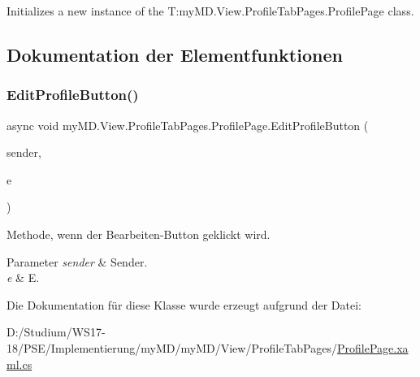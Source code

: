 Initializes a new instance of the T\+:my\+M\+D.\+View.\+Profile\+Tab\+Pages.\+Profile\+Page class. 



\subsection{Dokumentation der Elementfunktionen}
\mbox{\label{classmy_m_d_1_1_view_1_1_profile_tab_pages_1_1_profile_page_abab1096a4fd1feed046a0a83cd66ff84}} 
\subsubsection{\texorpdfstring{Edit\+Profile\+Button()}{EditProfileButton()}}
{\footnotesize\ttfamily async void my\+M\+D.\+View.\+Profile\+Tab\+Pages.\+Profile\+Page.\+Edit\+Profile\+Button (\begin{DoxyParamCaption}\item[{object}]{sender,  }\item[{System.\+Event\+Args}]{e }\end{DoxyParamCaption})}



Methode, wenn der Bearbeiten-\/\+Button geklickt wird. 


\begin{DoxyParams}{Parameter}
{\em sender} & Sender.\\
\hline
{\em e} & E.\\
\hline
\end{DoxyParams}


Die Dokumentation für diese Klasse wurde erzeugt aufgrund der Datei\+:\begin{DoxyCompactItemize}
\item 
D\+:/\+Studium/\+W\+S17-\/18/\+P\+S\+E/\+Implementierung/my\+M\+D/my\+M\+D/\+View/\+Profile\+Tab\+Pages/\mbox{\hyperlink{_profile_page_8xaml_8cs}{Profile\+Page.\+xaml.\+cs}}\end{DoxyCompactItemize}
